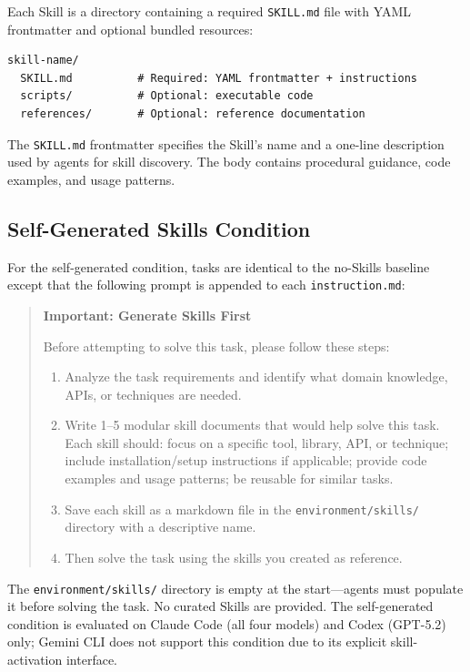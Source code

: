 Each Skill is a directory containing a required \texttt{SKILL.md} file with YAML frontmatter and optional bundled resources:

\begin{lstlisting}[basicstyle=\footnotesize\ttfamily]
skill-name/
  SKILL.md          # Required: YAML frontmatter + instructions
  scripts/          # Optional: executable code
  references/       # Optional: reference documentation
\end{lstlisting}

\noindent The \texttt{SKILL.md} frontmatter specifies the Skill's name and a one-line description used by agents for skill discovery. The body contains procedural guidance, code examples, and usage patterns.

\subsection{Self-Generated Skills Condition}
\label{app:self-gen}

For the self-generated condition, tasks are identical to the no-Skills baseline except that the following prompt is appended to each \texttt{instruction.md}:

\begin{quote}
\small
\textbf{Important: Generate Skills First}

Before attempting to solve this task, please follow these steps:

\begin{enumerate}[nosep]
\item Analyze the task requirements and identify what domain knowledge, APIs, or techniques are needed.
\item Write 1--5 modular skill documents that would help solve this task. Each skill should:
  focus on a specific tool, library, API, or technique;
  include installation/setup instructions if applicable;
  provide code examples and usage patterns;
  be reusable for similar tasks.
\item Save each skill as a markdown file in the \texttt{environment/skills/} directory with a descriptive name.
\item Then solve the task using the skills you created as reference.
\end{enumerate}
\end{quote}

\noindent The \texttt{environment/skills/} directory is empty at the start---agents must populate it before solving the task. No curated Skills are provided. The self-generated condition is evaluated on Claude Code (all four models) and Codex (GPT-5.2) only; Gemini CLI does not support this condition due to its explicit skill-activation interface.

